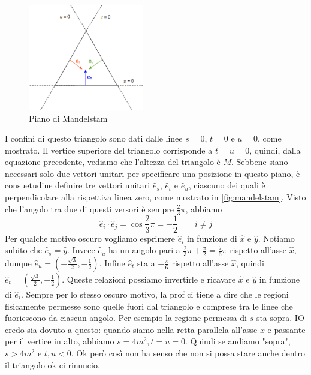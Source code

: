 \begin{itemize}
        \begin{figure}[h]
            \centering
            \includegraphics[width=0.45\textwidth]{immagini/fig_mandelstam.png}
            \caption{Piano di Mandelstam}%
            \label{fig:mandelstam}
        \end{figure}
        I confini di questo triangolo sono dati dalle linee \( s = 0 \), \( t = 0 \) e \( u = 0 \), come mostrato. Il vertice superiore del triangolo corrisponde a \( t = u = 0 \), quindi, dalla equazione precedente, vediamo che l'altezza del triangolo è \( M \). Sebbene siano necessari solo due vettori unitari per specificare una posizione in questo piano, è consuetudine definire tre vettori unitari \( \hat{e}_s \), \( \hat{e}_t \) e \( \hat{e}_u \), ciascuno dei quali è perpendicolare alla rispettiva linea zero, come mostrato in \autoref{fig:mandelstam}. Visto che l'angolo tra due di questi versori è sempre $\frac23\pi$, abbiamo 
          \begin{equation*}
          \hat{e}_i\cdot\hat{e}_j=\cos\frac23\pi=-\frac12 \qquad i\neq j
          \end{equation*}
        Per qualche motivo oscuro vogliamo esprimere ${\hat e_i}$ in funzione di $\hat x$ e $\hat y$. Notiamo subito che $\hat e_s=\hat y$. Invece $\hat e_u$ ha un angolo pari a $\frac23\pi+\frac\pi2=\frac76\pi$ rispetto all'asse $\hat x$, dunque $\hat e_u=(-\frac{\sqrt3} 2,-\frac12)$. Infine $\hat e_t$ sta a $-\frac\pi6$ rispetto all'asse $\hat x$, quindi $\hat e_t=(\frac{\sqrt3}2,-\frac12)$. Queste relazioni possiamo invertirle e ricavare $\hat x$ e $\hat y$ in funzione di $\hat e_i$. Sempre per lo stesso oscuro motivo, la prof ci tiene a dire che le regioni fisicamente permesse sono quelle fuori dal triangolo e comprese tra le linee che fuoriescono da ciascun angolo. Per esempio la regione permessa di $s$ sta sopra. IO credo sia dovuto a questo: quando siamo nella retta parallela all'asse $x$ e passante per il vertice in alto, abbiamo  $s=4m^2,t=u=0$. Quindi se andiamo "sopra", $s>4m^2$ e $t,u<0$. Ok però così non ha senso che non si possa stare anche dentro il triangolo ok ci rinuncio. 

\end{itemize}
